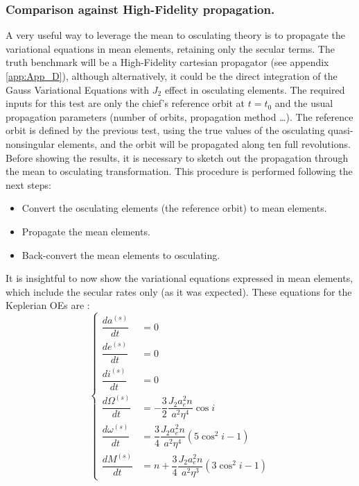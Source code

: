		\subsubsection{Comparison against High-Fidelity propagation.}\label{secCh4:BL_vs_HiFi}
		\indent A very useful way to leverage the mean to osculating theory is to propagate the variational equations in mean elements, retaining only the secular terms. The truth benchmark will be a High-Fidelity cartesian propagator (see appendix \ref{app:App_D}), although alternatively, it could be the direct integration of the Gauss Variational Equations with $J_2$ effect in osculating elements. The required inputs for this test are only the chief's reference orbit at $t = t_0$ and the usual propagation parameters (number of orbits, propagation method \ldots). The reference orbit is defined by the previous test, using the true values of the osculating quasi-nonsingular elements, and the orbit will be propagated along ten full revolutions.\\
		\indent Before showing the results, it is necessary to sketch out the propagation through the mean to osculating transformation. This procedure is performed following the next steps:
		\begin{itemize}
		\item[\GMVred{\nth{1}}] Convert the osculating elements (\ie the reference orbit) to mean elements. 
		\item[\GMVred{\nth{2}}] Propagate the mean elements.
		\item[\GMVred{\nth{3}}] Back-convert the mean elements to osculating.  
		\end{itemize}
		\indent It is insightful to now show the variational equations expressed in mean elements, which include the secular rates only (as it was expected). These equations for the Keplerian OEs are \cite{GA_STM}:
		\begin{equation}
		\left\{ \begin{array}{llll}
		\dfrac{da^{(s)}}{dt} 		& = 0 \\[1.2 em]
		\dfrac{de^{(s)}}{dt} 		& = 0 \\[1.2 em]
		\dfrac{di^{(s)}}{dt} 		& = 0 \\[1.2 em]
		\dfrac{d\Omega^{(s)}}{dt} 	& = -\dfrac{3}{2} \dfrac{J_2 a_e^2 n }{a^2 \eta^4} \cos i\\[1.2 em]
		\dfrac{d\omega^{(s)}}{dt} 	& =  \dfrac{3}{4} \dfrac{J_2 a_e^2 n }{a^2 \eta^4} \left( 5\cos^2 i - 1 \right) \\[1.2 em]
		\dfrac{dM^{(s)}}{dt}		& = n + \dfrac{3}{4} \dfrac{J_2 a_e^2 n }{a^2 \eta^3} \left( 3\cos^2 i - 1 \right)
		\end{array}\right.
		\label{eq:J2_mean_prop}
		\end{equation}
